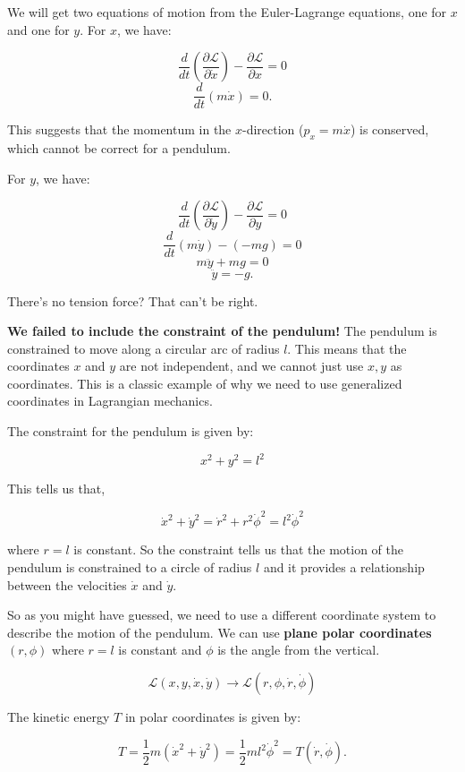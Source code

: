 \documentclass[11pt]{article}
\begin{document}
We will get two equations of motion from the Euler-Lagrange equations,
one for \(x\) and one for \(y\). For \(x\), we have:

\[\frac{d}{dt} \left( \frac{\partial \mathcal{L}}{\partial \dot{x}} \right) - \frac{\partial \mathcal{L}}{\partial x} = 0\]
\[\frac{d}{dt} \left( m \dot{x} \right) = 0.\]

This suggests that the momentum in the \(x\)-direction
(\(p_x= m\dot{x}\)) is conserved, which cannot be correct for a
pendulum.

For \(y\), we have:

\[\frac{d}{dt} \left( \frac{\partial \mathcal{L}}{\partial \dot{y}} \right) - \frac{\partial \mathcal{L}}{\partial y} = 0\]
\[\frac{d}{dt} \left( m \dot{y} \right) - (-mg) = 0\]
\[m\ddot{y} + mg = 0\] \[\ddot{y} = -g.\]

There's no tension force? That can't be right.

\textbf{We failed to include the constraint of the pendulum!} The
pendulum is constrained to move along a circular arc of radius \(l\).
This means that the coordinates \(x\) and \(y\) are not independent, and
we cannot just use \(x,y\) as coordinates. This is a classic example of
why we need to use generalized coordinates in Lagrangian mechanics.

The constraint for the pendulum is given by:

\[x^2 + y^2 = l^2\]

This tells us that,

\[\dot{x}^2 + \dot{y}^2 = \dot{r}^2 + r^2 \dot{\phi}^2 = l^2 \dot{\phi}^2\]

where \(r=l\) is constant. So the constraint tells us that the motion of
the pendulum is constrained to a circle of radius \(l\) and it provides
a relationship between the velocities \(\dot{x}\) and \(\dot{y}\).

So as you might have guessed, we need to use a different coordinate
system to describe the motion of the pendulum. We can use \textbf{plane
polar coordinates} \((r, \phi)\) where \(r=l\) is constant and \(\phi\)
is the angle from the vertical.

\[\mathcal{L}(x, y, \dot{x}, \dot{y}) \rightarrow \mathcal{L}(r, \phi, \dot{r}, \dot{\phi})\]

The kinetic energy \(T\) in polar coordinates is given by:

\[T = \frac{1}{2} m \left( \dot{x}^2 + \dot{y}^2 \right) = \frac{1}{2} ml^2\dot{\phi}^2 = T(\dot{r}, \dot{\phi}).\]
\end{document}
